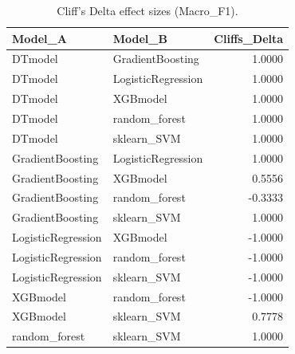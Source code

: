 \begin{table}[t]
\centering
\begin{tabular}{llr}
\toprule
Model_A & Model_B & Cliffs_Delta \\
\midrule
DTmodel & GradientBoosting & 1.0000 \\
DTmodel & LogisticRegression & 1.0000 \\
DTmodel & XGBmodel & 1.0000 \\
DTmodel & random_forest & 1.0000 \\
DTmodel & sklearn_SVM & 1.0000 \\
GradientBoosting & LogisticRegression & 1.0000 \\
GradientBoosting & XGBmodel & 0.5556 \\
GradientBoosting & random_forest & -0.3333 \\
GradientBoosting & sklearn_SVM & 1.0000 \\
LogisticRegression & XGBmodel & -1.0000 \\
LogisticRegression & random_forest & -1.0000 \\
LogisticRegression & sklearn_SVM & -1.0000 \\
XGBmodel & random_forest & -1.0000 \\
XGBmodel & sklearn_SVM & 0.7778 \\
random_forest & sklearn_SVM & 1.0000 \\
\bottomrule
\end{tabular}
\caption{Cliff's Delta effect sizes (Macro_F1).}
\label{tab:cliffs_Macro_F1}
\end{table}